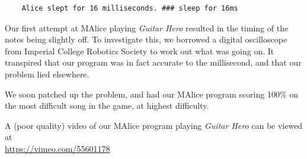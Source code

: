 \documentclass[11pt, notitlepage]{report}
\begin{document}
\begin{verbatim}
    Alice slept for 16 milliseconds. ### sleep for 16ms

\end{verbatim}

Our first attempt at MAlice playing \emph{Guitar Hero} resulted in the timing of the notes being slightly off. To investigate this, we borrowed a digital oscilloscope from Imperial College Robotics Society to work out what was going on. It transpired that our program was in fact accurate to the millisecond, and that our problem lied elsewhere.

We soon patched up the problem, and had our MAlice program scoring 100\% on the most difficult song in the game, at highest difficulty.

A (poor quality) video of our MAlice program playing \emph{Guitar Hero} can be viewed at\\
\url{https://vimeo.com/55601178}
\end{document}
